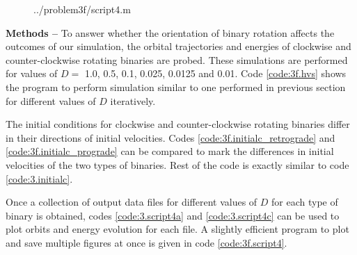 \documentclass[a4paper]{article}
\begin{document}
\begin{enumerate} [label*=\textbf{(\alph*)}]
				\begin{figure} [h]
					 {../problem3f/script4.m}
				\end{figure}
				
				\subitem \textbf{Methods --}
				To answer whether the orientation of binary rotation affects the outcomes of our simulation, the orbital trajectories and energies of clockwise and counter-clockwise rotating binaries are probed. These simulations are performed for values of \(D =\) 1.0, 0.5, 0.1, 0.025, 0.0125 and 0.01. Code \ref{code:3f.hvs} shows the program to perform simulation similar to one performed in previous section for different values of \(D\) iteratively.
				
				The initial conditions for clockwise and counter-clockwise rotating binaries differ in their directions of initial velocities. Codes \ref{code:3f.initialc_retrograde} and \ref{code:3f.initialc_prograde} can be compared to mark the differences in initial velocities of the two types of binaries. Rest of the code is exactly similar to code \ref{code:3.initialc}.
				
				Once a collection of output data files for different values of \(D\) for each type of binary is obtained, codes \ref{code:3.script4a} and \ref{code:3.script4c} can be used to plot orbits and energy evolution for each file. A slightly efficient program to plot and save multiple figures at once is given in code \ref{code:3f.script4}.
				

\end{enumerate}
\end{document}
